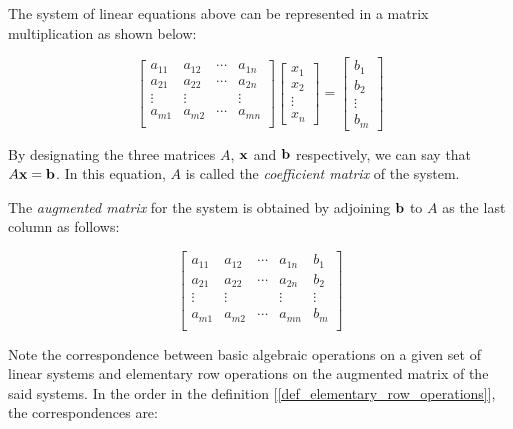 \documentclass{report}
\begin{document}
		The system of linear equations above can be represented in a matrix multiplication as shown below:
		
		\begin{displaymath}
			\begin{bmatrix}
				a_{11} & a_{12} & \cdots & a_{1n} \\
				a_{21} & a_{22} & \cdots & a_{2n} \\
				\vdots & \vdots &        & \vdots \\
				a_{m1} & a_{m2} & \cdots & a_{mn} \\
			\end{bmatrix}
			\begin{bmatrix}
				x_1 \\ x_2 \\ \vdots \\ x_n
			\end{bmatrix}
			=
			\begin{bmatrix}
				b_1 \\ b_2 \\ \vdots \\ b_m
			\end{bmatrix}
		\end{displaymath}
		
		By designating the three matrices $A$, $\bf{x}$ and $\bf{b}$ respectively, we can say that $A\bf{x}=\bf{b}$. In this equation, $A$ is called the \emph{coefficient matrix} of the system.
		
		The \emph{augmented matrix} for the system is obtained by adjoining $\bf{b}$ to $A$ as the last column as follows:
		
		\begin{displaymath}
			\left[\begin{array}{cccc|c}
				a_{11} & a_{12} & \cdots & a_{1n} & b_1\\
				a_{21} & a_{22} & \cdots & a_{2n} & b_2\\
				\vdots & \vdots &        & \vdots & \vdots\\
				a_{m1} & a_{m2} & \cdots & a_{mn} & b_m\\
			\end{array}\right]
		\end{displaymath}
		
		Note the correspondence between basic algebraic operations on a given set of linear systems and elementary row operations on the augmented matrix of the said systems. In the order in the definition [\ref{def_elementary_row_operations}], the correspondences are:
		
\end{document}
